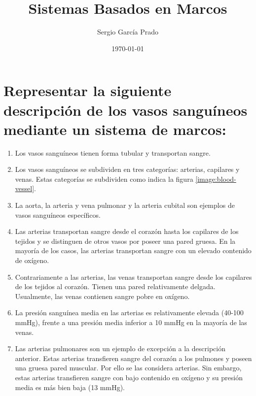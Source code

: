 \documentclass[10pt, a4paper,spanish]{article}
\title{\vspace{-15mm}\fontsize{24pt}{10pt}\selectfont\textbf{Sistemas Basados en Marcos}} %
\author{Sergio García Prado}
\date{\today}
\begin{document}
	\maketitle %

	\thispagestyle{fancy} %


  \section{Representar la siguiente descripción de los vasos sanguíneos mediante un sistema de marcos:}

    \begin{enumerate}[label=\alph*)]

      \item Los vasos sanguíneos tienen forma tubular y transportan sangre.

      \item Los vasos sanguíneos se subdividen en tres categorías: arterias, capilares y venas. Estas categorías se subdividen como indica la figura \ref{image:blood-vessel}.

      \item La aorta, la arteria y vena pulmonar y la arteria cubital son ejemplos de vasos sanguíneos específicos.

      \item Las arterias transportan sangre desde el corazón hasta los capilares de los tejidos y se distinguen de otros vasos por poseer una pared gruesa. En la mayoría de los casos, las arterias transportan sangre con un elevado contenido de oxígeno.

      \item Contrariamente a las arterias, las venas transportan sangre desde los capilares de los tejidos al corazón. Tienen una pared relativamente delgada. Usualmente, las venas contienen sangre pobre en oxígeno.

      \item La presión sanguínea media en las arterias es relativamente elevada (40-100 mmHg), frente a una presión media inferior a 10 mmHg en la mayoría de las venas.

      \item Las arterias pulmonares son un ejemplo de excepción a la descripción anterior. Estas arterias transfieren sangre del corazón a los pulmones y poseen una gruesa pared muscular. Por ello se las considera arterias. Sin embargo, estas arterias transfieren sangre con bajo contenido en oxígeno y su presión media es más bien baja (13 mmHg).


\end{enumerate}
\end{document}
